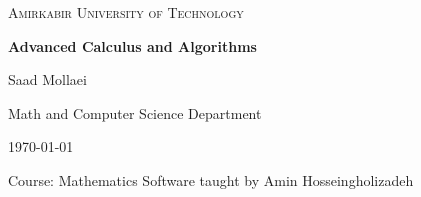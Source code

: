 \documentclass[12pt]{article}
\begin{document}
\begin{titlepage}
	\centering
	
	
	{\scshape\LARGE Amirkabir University of Technology \par}
	\vspace{1cm}
	{\huge\bfseries Advanced Calculus and Algorithms \par}
	\vspace{0.5cm}
	{\Large\itshape \par}
	\vspace{1.5cm}
	
	{\large Saad Mollaei \par}
	\vspace{0.5cm}
	{\large Math and Computer Science Department \par}
	\vspace{1cm}
	
	{\large \today \par}
	
	\vfill
	
	{\small Course: Mathematics Software taught by Amin Hosseingholizadeh}
\end{titlepage}


\tableofcontents
\newpage
\end{document}
